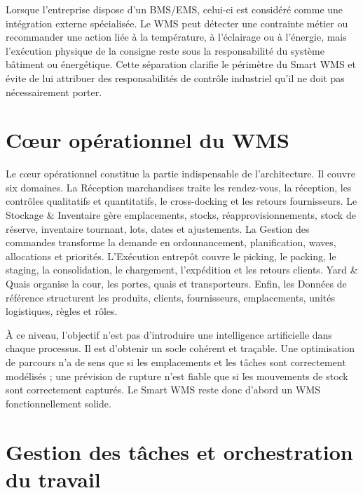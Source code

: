 Lorsque l’entreprise dispose d’un BMS/EMS, celui-ci est considéré comme une intégration externe spécialisée. Le WMS peut détecter une contrainte métier ou recommander une action liée à la température, à l’éclairage ou à l’énergie, mais l’exécution physique de la consigne reste sous la responsabilité du système bâtiment ou énergétique. Cette séparation clarifie le périmètre du Smart WMS et évite de lui attribuer des responsabilités de contrôle industriel qu’il ne doit pas nécessairement porter.



\section{Cœur opérationnel du WMS}

\label{sec:4.4}

Le cœur opérationnel constitue la partie indispensable de l’architecture. Il couvre six domaines. La Réception marchandises traite les rendez-vous, la réception, les contrôles qualitatifs et quantitatifs, le cross-docking et les retours fournisseurs. Le Stockage \& Inventaire gère emplacements, stocks, réapprovisionnements, stock de réserve, inventaire tournant, lots, dates et ajustements. La Gestion des commandes transforme la demande en ordonnancement, planification, waves, allocations et priorités. L’Exécution entrepôt couvre le picking, le packing, le staging, la consolidation, le chargement, l’expédition et les retours clients. Yard \& Quais organise la cour, les portes, quais et transporteurs. Enfin, les Données de référence structurent les produits, clients, fournisseurs, emplacements, unités logistiques, règles et rôles.


À ce niveau, l’objectif n’est pas d’introduire une intelligence artificielle dans chaque processus. Il est d’obtenir un socle cohérent et traçable. Une optimisation de parcours n’a de sens que si les emplacements et les tâches sont correctement modélisés ; une prévision de rupture n’est fiable que si les mouvements de stock sont correctement capturés. Le Smart WMS reste donc d’abord un WMS fonctionnellement solide.






\section{Gestion des tâches et orchestration du travail}

